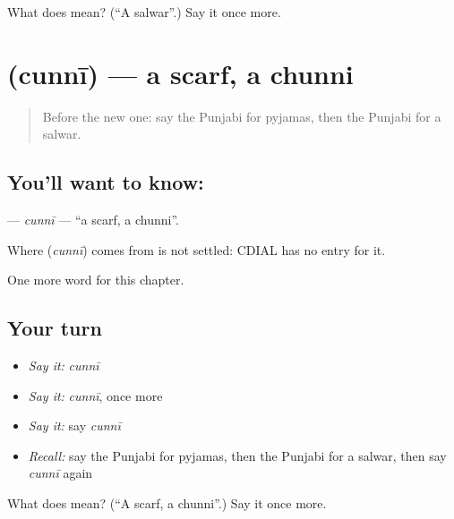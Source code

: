 \begin{tcolorbox}[breakable,colback=teal!4,colframe=teal!35!black,title={Before you move on}]
What does  mean? (\textquotedblleft{}A salwar\textquotedblright{}.) Say it once more.
\end{tcolorbox}
\section[\texorpdfstring{\pa{ਚੁੰਨੀ} (cunnī)}{ਚੁੰਨੀ (cunnī)}]{ (cunnī) — a scarf, a chunni}

\label{lesson:PA-C119-cunni}



\begin{quote}
Before the new one: say the Punjabi for pyjamas, then the Punjabi for a salwar.
\end{quote}

\subsection*{You'll want to know: }
\textbf{} — \emph{cunnī} — \textquotedblleft{}a scarf, a chunni\textquotedblright{}.

\begin{cousinweb}
Where \textbf{} (\emph{cunnī}) comes from is not settled: CDIAL has no entry for it.
\end{cousinweb}

\begin{grammarlens}[title={What you've built}]
One more word for this chapter.
\end{grammarlens}

\subsection*{Your turn}
\begin{itemize}
\raggedright
  \item \emph{Say it:} \emph{cunnī}
  \item \emph{Say it:} \emph{cunnī}, once more
  \item \emph{Say it:} say \emph{cunnī}
  \item \emph{Recall:} say the Punjabi for pyjamas, then the Punjabi for a salwar, then say \emph{cunnī} again
\end{itemize}

\begin{tcolorbox}[breakable,colback=teal!4,colframe=teal!35!black,title={Before you move on}]
What does  mean? (\textquotedblleft{}A scarf, a chunni\textquotedblright{}.) Say it once more.
\end{tcolorbox}
